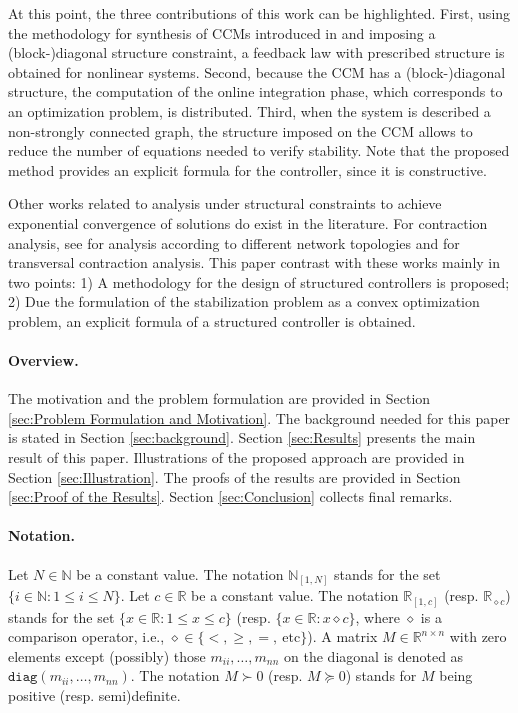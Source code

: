 \documentclass[10pt,twocolumn,twoside]{IEEEtran}
\theoremstyle{plain}
\theoremstyle{definition}
\theoremstyle{remark}
\begin{document}
At this point, the three contributions of this work can be highlighted. First, using the methodology for synthesis of CCMs introduced in \cite{Manchester2014a} and imposing a (block-)diagonal structure constraint, a feedback law with prescribed structure is obtained for nonlinear systems. Second, because the CCM has a (block-)diagonal structure, the computation of the online integration phase, which corresponds to an optimization problem, is distributed. Third, when the system is described a non-strongly connected graph, the structure imposed on the CCM allows to reduce the number of equations needed to  verify stability. Note that the proposed method provides an explicit formula for the controller, since it is constructive.

Other works related to analysis under structural constraints to achieve exponential convergence of solutions do exist in the literature. For contraction analysis, see \cite{Aminzare2014a} for analysis according to different network topologies and \cite{Andrieu2016} for transversal contraction analysis. This paper contrast with these works mainly in two points: 1) A  methodology for the design of structured controllers is proposed; 2) Due the formulation of the stabilization problem as a convex optimization problem, an explicit formula of a structured controller is obtained.

\paragraph{Overview.} The motivation and the problem formulation are provided in Section \ref{sec:Problem Formulation and Motivation}. The background needed for this paper is stated in Section \ref{sec:background}. Section \ref{sec:Results} presents the main result of this paper. Illustrations of the proposed approach are provided in Section \ref{sec:Illustration}. The proofs of the results are provided in Section \ref{sec:Proof of the Results}. Section \ref{sec:Conclusion} collects final remarks.

\paragraph{Notation.} Let $N\in\mathbb{N}$ be a constant value. The notation $\mathbb{N}_{[1,N]}$ stands for the set $\{i\in\mathbb{N}:1\leq i\leq N\}$. Let $c\in\mathbb{R}$ be a constant value. The notation $\mathbb{R}_{[1,c]}$ (resp. $\mathbb{R}_{\diamond c}$) stands for the set $\{x\in\mathbb{R}:1\leq x\leq c\}$ (resp.  $\{x\in\mathbb{R}:x\diamond c\}$, where $\diamond$ is a comparison operator, i.e., $\diamond\in\{<,\geq,=,\ \text{etc}\}$). A matrix $M\in\mathbb{R}^{n\times n}$ with zero elements except (possibly) those  $m_{ii},\ldots,m_{nn}$ on the diagonal is denoted as $\mathbin{\mathtt{diag}}(m_{ii},\ldots,m_{nn})$. The notation $M\succ 0$ (resp. $M\succeq 0$) stands for $M$ being positive (resp. semi)definite.
\end{document}

